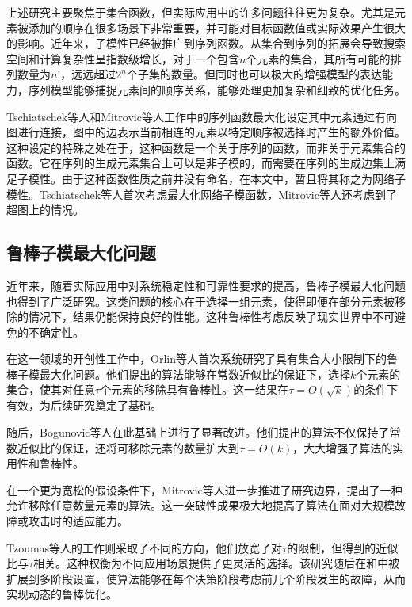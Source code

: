 上述研究主要聚焦于集合函数，但实际应用中的许多问题往往更为复杂。尤其是元素被添加的顺序在很多场景下非常重要，并可能对目标函数值或实际效果产生很大的影响。近年来，子模性已经被推广到序列函数\cite{zhang2015string,tschiatschek2017selecting,streeter2008online,zhang2013near}。从集合到序列的拓展会导致搜索空间和计算复杂性呈指数级增长，对于一个包含$n$个元素的集合，其所有可能的排列数量为$n!$，远远超过$2^n$个子集的数量。但同时也可以极大的增强模型的表达能力，序列模型能够捕捉元素间的顺序关系，能够处理更加复杂和细致的优化任务。

Tschiatschek等人\cite{tschiatschek2017selecting}和Mitrovic等人\cite{mitrovic2018submodularity}工作中的序列函数最大化设定其中元素通过有向图进行连接，图中的边表示当前相连的元素以特定顺序被选择时产生的额外价值。这种设定的特殊之处在于，这种函数是一个关于序列的函数，而非关于元素集合的函数。它在序列的生成元素集合上可以是非子模的，而需要在序列的生成边集上满足子模性。由于这种函数性质之前并没有命名，在本文中，暂且将其称之为网络子模性。Tschiatschek等人\cite{tschiatschek2017selecting}首次考虑最大化网络子模函数，Mitrovic等人\cite{mitrovic2018submodularity}还考虑到了超图上的情况。

\subsection{鲁棒子模最大化问题}

近年来，随着实际应用中对系统稳定性和可靠性要求的提高，鲁棒子模最大化问题也得到了广泛研究。这类问题的核心在于选择一组元素，使得即便在部分元素被移除的情况下，结果仍能保持良好的性能。这种鲁棒性考虑反映了现实世界中不可避免的不确定性。

在这一领域的开创性工作中，Orlin等人\cite{orlin2018robust}首次系统研究了具有集合大小限制下的鲁棒子模最大化问题。他们提出的算法能够在常数近似比的保证下，选择$k$个元素的集合，使其对任意$\tau$个元素的移除具有鲁棒性。这一结果在$\tau = O(\sqrt{k})$的条件下有效，为后续研究奠定了基础。

随后，Bogunovic等人\cite{bogunovic2017robust}在此基础上进行了显著改进。他们提出的算法不仅保持了常数近似比的保证，还将可移除元素的数量扩大到$\tau = O(k)$，大大增强了算法的实用性和鲁棒性。

在一个更为宽松的假设条件下，Mitrovic等人\cite{mitrovic2017streaming}进一步推进了研究边界，提出了一种允许移除任意数量元素的算法。这一突破性成果极大地提高了算法在面对大规模故障或攻击时的适应能力。

Tzoumas等人的工作\cite{tzoumas2017resilient}则采取了不同的方向，他们放宽了对$\tau$的限制，但得到的近似比与$\tau$相关。这种权衡为不同应用场景提供了更灵活的选择。该研究随后在\cite{tzoumas2018resilient}和\cite{tzoumas2020robust}中被扩展到多阶段设置，使算法能够在每个决策阶段考虑前几个阶段发生的故障，从而实现动态的鲁棒优化。

